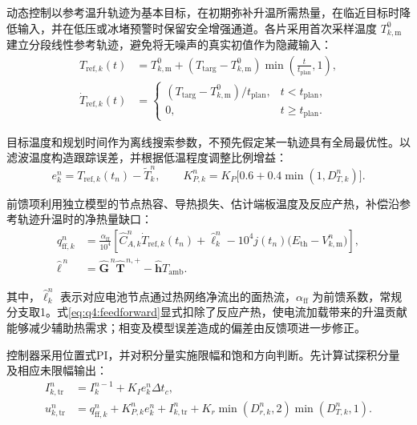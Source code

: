 \documentclass[bwprint]{gmcmthesis}
\numberwithin{equation}{section}
\numberwithin{figure}{section}
\begin{document}
动态控制以参考温升轨迹为基本目标，在初期弥补升温所需热量，在临近目标时降低输入，并在低压或冰堵预警时保留安全增强通道。各片采用首次采样温度 $T_{k,\mathrm m}^{0}$ 建立分段线性参考轨迹，避免将无噪声的真实初值作为隐藏输入：
\begin{equation}
\begin{aligned}
T_{\mathrm{ref},k}(t)&=T_{k,\mathrm m}^{0}+
(T_{\mathrm{targ}}-T_{k,\mathrm m}^{0})\min\!\left(\frac{t}{t_{\mathrm{plan}}},1\right),
\\
\dot T_{\mathrm{ref},k}(t)&=\begin{cases}
(T_{\mathrm{targ}}-T_{k,\mathrm m}^{0})/t_{\mathrm{plan}}, & t<t_{\mathrm{plan}},\\
0, & t\geq t_{\mathrm{plan}}.
\end{cases}
\end{aligned}
\label{eq:q4:temperature_reference}
\end{equation}

目标温度和规划时间作为离线搜索参数，不预先假定某一轨迹具有全局最优性。以滤波温度构造跟踪误差，并根据低温程度调整比例增益：
\begin{equation}
e_k^n=T_{\mathrm{ref},k}(t_n)-\widetilde T_k^n,
\qquad
K_{P,k}^n=K_P\big[0.6+0.4\min(1,D_{T,k}^n)\big].
\label{eq:q4:tracking_error_gain}
\end{equation}

前馈项利用独立模型的节点热容、导热损失、估计端板温度及反应产热，补偿沿参考轨迹升温时的净热量缺口：
\begin{equation}
\begin{aligned}
q_{\mathrm{ff},k}^n
&=\frac{\alpha_{\mathrm{ff}}}{10^4}
\left[\widehat C_{A,k}^n\dot T_{\mathrm{ref},k}(t_n)
+\widehat\ell_k^n-10^4j(t_n)\big(E_{\mathrm{th}}-V_{k,\mathrm m}^n\big)\right],
\\
\widehat{\boldsymbol\ell}^{\,n}
&=\widehat{\boldsymbol G}^{\,n}\widehat{\boldsymbol T}^{\,n,+}
-\widehat{\boldsymbol h}T_{\mathrm{amb}}.
\end{aligned}
\label{eq:q4:feedforward}
\end{equation}

其中，$\widehat\ell_k^n$ 表示对应电池节点通过热网络净流出的面热流，$\alpha_{\mathrm{ff}}$ 为前馈系数，常规分支取1。式\eqref{eq:q4:feedforward}显式扣除了反应产热，使电流加载带来的升温贡献能够减少辅助热需求；相变及模型误差造成的偏差由反馈项进一步修正。

控制器采用位置式PI，并对积分量实施限幅和饱和方向判断。先计算试探积分量及相应未限幅输出：
\begin{equation}
\begin{aligned}
I_{k,\mathrm{tr}}^n&=I_k^{n-1}+K_Ie_k^n\Delta t_c,\\
u_{k,\mathrm{tr}}^n&=q_{\mathrm{ff},k}^n+K_{P,k}^ne_k^n+I_{k,\mathrm{tr}}^n
+K_r\min(D_{r,k}^n,2)\min(D_{T,k}^n,1).
\end{aligned}
\label{eq:q4:trial_integral}
\end{equation}
\end{document}
